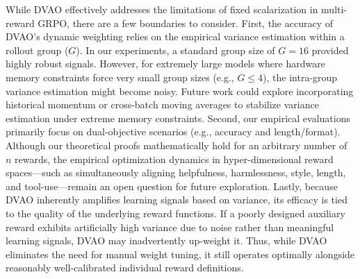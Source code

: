 \documentclass{llmxive}
\begin{document}
While DVAO effectively addresses the limitations of fixed scalarization in multi-reward GRPO, there are a few boundaries to consider. First, the accuracy of DVAO's dynamic weighting relies on the empirical variance estimation within a rollout group ($G$). In our experiments, a standard group size of $G=16$ provided highly robust signals. However, for extremely large models where hardware memory constraints force very small group sizes (e.g., $G \le 4$), the intra-group variance estimation might become noisy. Future work could explore incorporating historical momentum or cross-batch moving averages to stabilize variance estimation under extreme memory constraints. Second, our empirical evaluations primarily focus on dual-objective scenarios (e.g., accuracy and length/format). Although our theoretical proofs mathematically hold for an arbitrary number of $n$ rewards, the empirical optimization dynamics in hyper-dimensional reward spaces—such as simultaneously aligning helpfulness, harmlessness, style, length, and tool-use—remain an open question for future exploration. Lastly, because DVAO inherently amplifies learning signals based on variance, its efficacy is tied to the quality of the underlying reward functions. If a poorly designed auxiliary reward exhibits artificially high variance due to noise rather than meaningful learning signals, DVAO may inadvertently up-weight it. Thus, while DVAO eliminates the need for manual weight tuning, it still operates optimally alongside reasonably well-calibrated individual reward definitions.


% 
\end{document}
